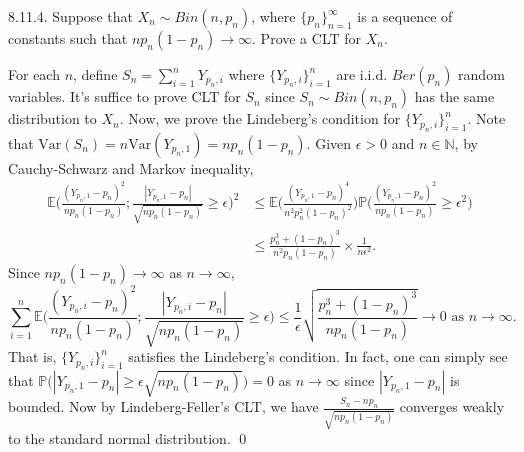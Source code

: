 \begin{exercise}8.11.4. Suppose that $X_n\sim Bin(n, p_n)$, where $\{p_n\}_{n=1}^\infty$ is a sequence of constants such that $np_n(1-p_n)\rightarrow\infty$. Prove a CLT for $X_n$.
\end{exercise}
\begin{answer}
For each $n$, define $S_n=\sum_{i=1}^n{Y_{p_n,i}}$ where $\{Y_{p_n,i}\}_{i=1}^n$ are i.i.d. $Ber(p_n)$ random variables. It's suffice to prove CLT for $S_n$ since $S_n\sim Bin(n,p_n)$ has the same distribution to $X_n$. Now, we prove the Lindeberg's condition for $\{Y_{p_n,i}\}_{i=1}^n$. Note that $\text{Var}(S_n)=n\text{Var}(Y_{p_n,1})=np_n(1-p_n)$. Given $\epsilon>0$ and $n\in\mathbb{N}$, by Cauchy-Schwarz and Markov inequality,
\begin{equation*}
\begin{aligned}
    \mathbb{E}\Big(\frac{(Y_{p_n,1}-p_n)^2}{np_n(1-p_n)};\frac{|Y_{p_n,1}-p_n|}{\sqrt{np_n(1-p_n)}}\geq\epsilon\Big)^2&\leq\mathbb{E}\Big(\frac{(Y_{p_n,1}-p_n)^4}{n^2p_n^2(1-p_n)^2}\Big)\mathbb{P}\Big(\frac{(Y_{p_n,1}-p_n)^2}{np_n(1-p_n)}\geq\epsilon^2\Big)
    \\&
    \leq\frac{p_n^3+(1-p_n)^3}{n^2p_n(1-p_n)}\times\frac{1}{n\epsilon^2}.
\end{aligned}
\end{equation*}
Since $np_n(1-p_n)\rightarrow\infty$ as $n\rightarrow\infty$,
\begin{equation*}
    \sum_{i=1}^n\mathbb{E}\Big(\frac{(Y_{p_n,i}-p_n)^2}{np_n(1-p_n)};\frac{|Y_{p_n,i}-p_n|}{\sqrt{np_n(1-p_n)}}\geq\epsilon\Big)\leq
    \frac{1}{\epsilon}\sqrt{\frac{p_n^3+(1-p_n)^3}{np_n(1-p_n)}}\rightarrow 0\text{ as }n\rightarrow\infty.
\end{equation*}
That is, $\{Y_{p_n,i}\}_{i=1}^n$ satisfies the Lindeberg's condition. In fact, one can simply see that $\mathbb{P}\big(|Y_{p_n,1}-p_n|\geq\epsilon\sqrt{np_n(1-p_n)}\big)=0$ as $n\rightarrow\infty$ since $|Y_{p_n,1}-p_n|$ is bounded. Now by Lindeberg-Feller's CLT, we have $\frac{S_n-np_n}{\sqrt{np_n(1-p_n)}}$ converges weakly to the standard normal distribution. \qed\qquad
\end{answer}

